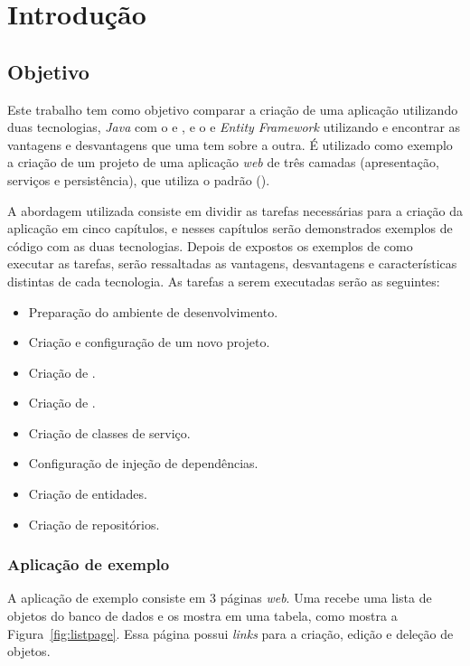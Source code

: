 \chapter{Introdução}
\label{cap:introducao}

\section{Objetivo}
\label{sec:objetivo}

Este trabalho tem como objetivo comparar a criação de uma aplicação utilizando duas tecnologias, \textit{Java} com o  e , e o  e \textit{Entity Framework} utilizando  e encontrar as vantagens e desvantagens que uma tem sobre a outra. 
É utilizado como exemplo a criação de um projeto de uma aplicação \textit{web} de três camadas (apresentação, serviços e persistência), que utiliza o padrão  ().

A abordagem utilizada consiste em dividir as tarefas necessárias para a criação da aplicação em cinco capítulos, e nesses capítulos serão demonstrados exemplos de código com as duas tecnologias. 
Depois de expostos os exemplos de como executar as tarefas, serão ressaltadas as vantagens, desvantagens e características distintas de cada tecnologia. As tarefas a serem executadas serão as seguintes:

\begin{itemize}
  \item Preparação do ambiente de desenvolvimento.
  \item Criação e configuração de um novo projeto.
  \item Criação de .
  \item Criação de .
  \item Criação de classes de serviço.
  \item Configuração de injeção de dependências.
  \item Criação de entidades.
  \item Criação de repositórios.
\end{itemize}

\subsection{Aplicação de exemplo}

A aplicação de exemplo consiste em 3 páginas \textit{web}. 
Uma recebe uma lista de objetos do banco de dados e os mostra em uma tabela, como mostra a Figura~\ref{fig:listpage}. 
Essa página possui \textit{links} para a criação, edição e deleção de objetos. 

